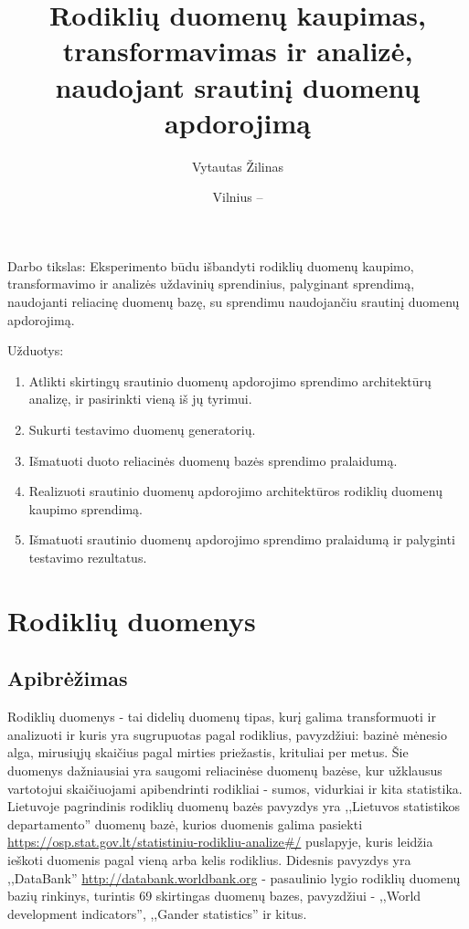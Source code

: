\documentclass{VUMIFPSkursinis}
\title{Rodiklių duomenų kaupimas, transformavimas ir analizė, naudojant srautinį duomenų apdorojimą}
\author{Vytautas Žilinas}
\date{Vilnius – \the\year}
\begin{document}
	
\maketitle
\cleardoublepage{}
\setcounter{page}{2}

\tableofcontents


Darbo tikslas: Eksperimento būdu išbandyti rodiklių duomenų kaupimo, transformavimo ir analizės uždavinių sprendinius, palyginant sprendimą, naudojanti reliacinę duomenų bazę, su sprendimu naudojančiu srautinį duomenų apdorojimą.

Užduotys:
\begin{enumerate}
    \item Atlikti skirtingų srautinio duomenų apdorojimo sprendimo architektūrų analizę, ir pasirinkti vieną iš jų tyrimui.
    \item Sukurti testavimo duomenų generatorių.
    \item Išmatuoti duoto reliacinės duomenų bazės sprendimo pralaidumą.
    \item Realizuoti srautinio duomenų apdorojimo architektūros rodiklių duomenų kaupimo sprendimą.
    \item Išmatuoti srautinio duomenų apdorojimo sprendimo pralaidumą ir palyginti testavimo rezultatus.
\end{enumerate}


\section{Rodiklių duomenys}

\subsection{Apibrėžimas}

Rodiklių duomenys - tai didelių duomenų tipas, kurį galima transformuoti ir analizuoti ir kuris yra sugrupuotas pagal rodiklius, 
pavyzdžiui: bazinė mėnesio alga, mirusiųjų skaičius pagal mirties priežastis, krituliai per metus. Šie duomenys dažniausiai yra saugomi reliacinėse duomenų bazėse, 
kur užklausus vartotojui skaičiuojami apibendrinti rodikliai - sumos, vidurkiai ir kita statistika.
Lietuvoje pagrindinis rodiklių duomenų bazės pavyzdys yra ,,Lietuvos statistikos departamento'' duomenų bazė, kurios duomenis galima pasiekti
\url{https://osp.stat.gov.lt/statistiniu-rodikliu-analize#/} puslapyje, kuris leidžia ieškoti duomenis pagal vieną arba kelis rodiklius. Didesnis pavyzdys yra ,,DataBank''
\url{http://databank.worldbank.org} - pasaulinio lygio rodiklių duomenų bazių rinkinys, turintis 69 skirtingas duomenų bazes, pavyzdžiui - ,,World development indicators'',
,,Gander statistics'' ir kitus\cite{databank-stats}.
\end{document}
